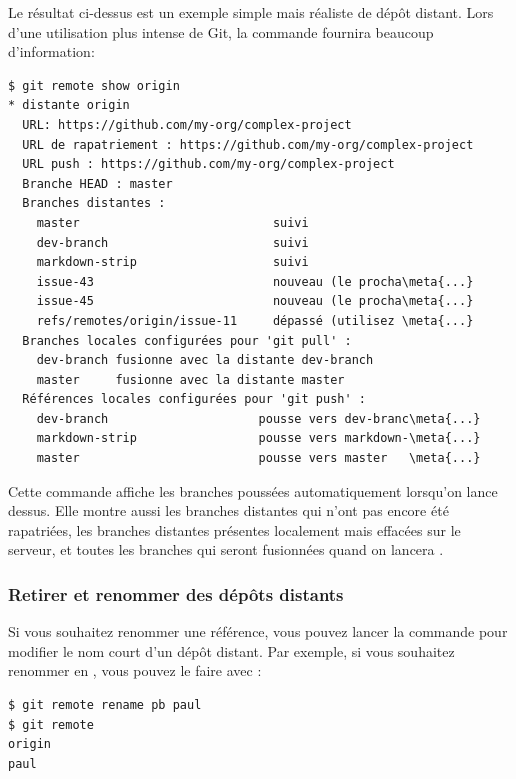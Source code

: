 Le résultat ci-dessus est un exemple simple mais réaliste de dépôt distant.
Lors d'une utilisation plus intense de Git, la commande  fournira beaucoup d'information:
\begin{Schunk}
\begin{Verbatim}[commandchars=\\\{\}]
$ git remote show origin
* distante origin
  URL: https://github.com/my-org/complex-project
  URL de rapatriement : https://github.com/my-org/complex-project
  URL push : https://github.com/my-org/complex-project
  Branche HEAD : master
  Branches distantes :
    master                           suivi
    dev-branch                       suivi
    markdown-strip                   suivi
    issue-43                         nouveau (le procha\meta{...}
    issue-45                         nouveau (le procha\meta{...}
    refs/remotes/origin/issue-11     dépassé (utilisez \meta{...}
  Branches locales configurées pour 'git pull' :
    dev-branch fusionne avec la distante dev-branch
    master     fusionne avec la distante master
  Références locales configurées pour 'git push' :
    dev-branch                     pousse vers dev-branc\meta{...}
    markdown-strip                 pousse vers markdown-\meta{...}
    master                         pousse vers master   \meta{...}
\end{Verbatim}
\end{Schunk}

Cette commande affiche les branches poussées automatiquement lorsqu'on lance  dessus.
Elle montre aussi les branches distantes qui n'ont pas encore été rapatriées, les branches distantes présentes localement mais effacées sur le serveur, et toutes les branches qui seront fusionnées quand on lancera .

\subsubsection{Retirer et renommer des dépôts distants}

Si vous souhaitez renommer une référence, vous pouvez lancer la commande  pour modifier le nom court d'un dépôt distant.
Par exemple, si vous souhaitez renommer  en , vous pouvez le faire avec :
\begin{Schunk}
\begin{Verbatim}
$ git remote rename pb paul
$ git remote
origin
paul
\end{Verbatim}
\end{Schunk}


